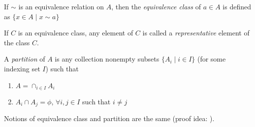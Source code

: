 \documentclass[titlepage, 12pt]{article}
\begin{document}
If $\sim$ is an equivalence relation on $A$, then the \textit{equivalence class}
of $a\in A$ is defined as $\{x\in A\mid x\sim a\}$

If $C$ is an equivalence class, any element of $C$ is called a
\textit{representative} element of the class $C$.

A \textit{partition} of $A$ is any collection nonempty subsets $\{A_i\mid i\in
I\}$ (for some indexing set $I$) such that

	\begin{enumerate}

		\item $A = \cap_{i\in I} A_i$

		\item $A_i\cap A_j = \phi$, $\forall i, j\in I$ such that $i\neq j$

	\end{enumerate}

	Notions of equivalence class and partition are the same (proof idea: ).
\end{document}
